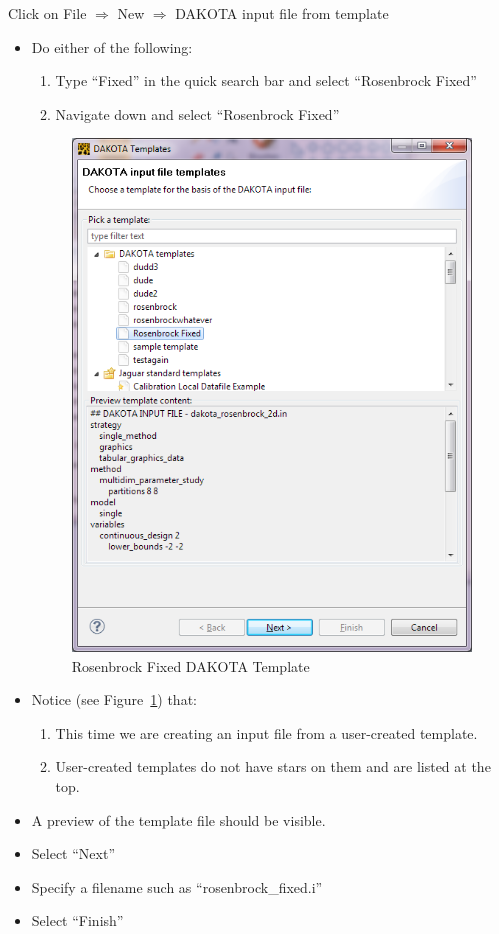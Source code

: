 Click on File $\Rightarrow$ New $\Rightarrow$ DAKOTA input file from template 
\begin{itemize}
\item Do either of the following:
\begin{enumerate}
\item Type ``Fixed'' in the quick search bar and select ``Rosenbrock Fixed''
\item Navigate down and select ``Rosenbrock Fixed''
\end{enumerate}
\begin{figure}[htbp]
  \centering
  \includegraphics[scale=0.6]{images/10Template_Rosenbrock}
  \caption{Rosenbrock Fixed DAKOTA Template}
  \label{fig:input:10Template_Rosenbrock}
\end{figure}

\item Notice (see Figure~\ref{fig:input:10Template_Rosenbrock}) that:
\begin{enumerate}
\item This time we are creating an input file from a user-created template.
\item User-created templates do not have stars on them and are listed at the top.
\end{enumerate} 
\item A preview of the template file should be visible.
\item Select ``Next''
\item Specify a filename such as ``rosenbrock\_fixed.i'' 
\item Select ``Finish''
\end{itemize}


